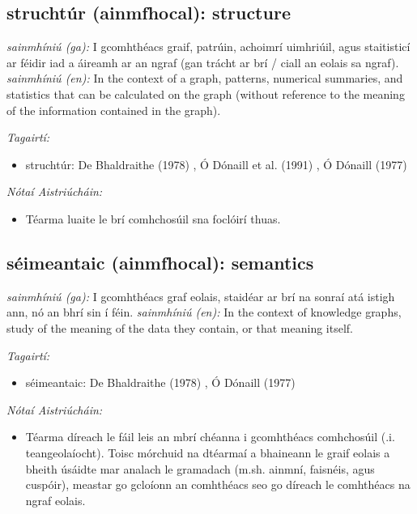 \documentclass{article}
\begin{document}
\subsection*{struchtúr (ainmfhocal): structure} 
 \noindent \textit{sainmhíniú (ga):} I gcomhthéacs graif, patrúin, achoimrí uimhriúil, agus staitisticí ar féidir iad a áireamh ar an ngraf (gan trácht ar brí / ciall an eolais sa ngraf).
\newline\newline
 \noindent \textit{sainmhíniú (en):} In the context of a graph, patterns, numerical summaries, and statistics that can be calculated on the graph (without reference to the meaning of the information contained in the graph).
\newline

 \noindent \textit{Tagairtí:}
\begin{itemize}
	\item struchtúr: De Bhaldraithe (1978) \cite{de-bhaldraithe}, Ó Dónaill et al. (1991) \cite{focloir-beag}, Ó Dónaill (1977) \cite{odonaill}
\end{itemize}

 \noindent \textit{Nótaí Aistriúcháin:}
\begin{itemize}
	\item Téarma luaite le brí comhchosúil sna foclóirí thuas.
\end{itemize}


\subsection*{séimeantaic (ainmfhocal): semantics} 
 \noindent \textit{sainmhíniú (ga):} I gcomhthéacs graf eolais, staidéar ar brí na sonraí atá istigh ann, nó an bhrí sin í féin.
\newline\newline
 \noindent \textit{sainmhíniú (en):} In the context of knowledge graphs, study of the meaning of the data they contain, or that meaning itself.
\newline

 \noindent \textit{Tagairtí:}
\begin{itemize}
	\item séimeantaic: De Bhaldraithe (1978) \cite{de-bhaldraithe}, Ó Dónaill (1977) \cite{odonaill}
\end{itemize}

 \noindent \textit{Nótaí Aistriúcháin:}
\begin{itemize}
	\item Téarma díreach le fáil leis an mbrí chéanna i gcomhthéacs comhchosúil (.i. teangeolaíocht). Toisc mórchuid na dtéarmaí a bhaineann le graif eolais a bheith úsáidte mar analach le gramadach (m.sh. ainmní, faisnéis, agus cuspóir), meastar go gcloíonn an comhthéacs seo go díreach le comhthéacs na ngraf eolais.
\end{itemize}
\end{document}
